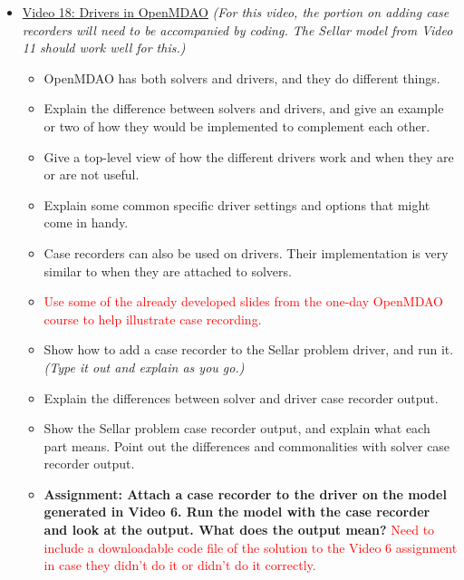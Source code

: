 \documentclass[12pt, letterpaper]{article}
\begin{document}
\begin{itemize}
	\item \underline{Video 18: Drivers in OpenMDAO} \textit{(For this video, the portion on adding case recorders will need to be accompanied by coding. The Sellar model from Video 11 should work well for this.)}
		\begin{itemize}
			\item OpenMDAO has both solvers and drivers, and they do different things.
			\item Explain the difference between solvers and drivers, and give an example or two of how they would be implemented to complement each other.
			\item Give a top-level view of how the different drivers work and when they are or are not useful.
			\item Explain some common specific driver settings and options that might come in handy.
			\item Case recorders can also be used on drivers. Their implementation is very similar to when they are attached to solvers.
			\item \textcolor{red}{Use some of the already developed slides from the one-day OpenMDAO course to help illustrate case recording.}
			\item Show how to add a case recorder to the Sellar problem driver, and run it. \textit{(Type it out and explain as you go.)}
			\item Explain the differences between solver and driver case recorder output.
			\item Show the Sellar problem case recorder output, and explain what each part means. Point out the differences and commonalities with solver case recorder output.
			\item \textbf{Assignment: Attach a case recorder to the driver on the model generated in Video 6. Run the model with the case recorder and look at the output. What does the output mean?} \textcolor{red}{Need to include a downloadable code file of the solution to the Video 6 assignment in case they didn't do it or didn't do it correctly.}
		\end{itemize}
		

\end{itemize}
\end{document}
